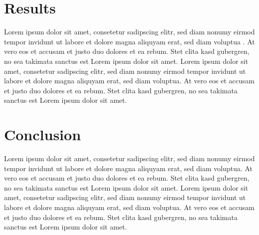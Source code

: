 \documentclass[a4paper]{article}
\begin{document}
\section{Results} %
\label{sec:results}
Lorem ipsum dolor sit amet, consetetur sadipscing elitr, sed diam nonumy eirmod tempor invidunt ut labore et dolore magna aliquyam erat, sed diam voluptua \citep[p. 48]{Baddeley:1974ts}. At vero eos et accusam et justo duo dolores et ea rebum. Stet clita kasd gubergren, no sea takimata sanctus est Lorem ipsum dolor sit amet. Lorem ipsum dolor sit amet, consetetur sadipscing elitr, sed diam nonumy eirmod tempor invidunt ut labore et dolore magna aliquyam erat, sed diam voluptua. At vero eos et accusam et justo duo dolores et ea rebum. Stet clita kasd gubergren, no sea takimata sanctus est Lorem ipsum dolor sit amet.

\section{Conclusion} %
\label{sec:conclusion}
Lorem ipsum dolor sit amet, consetetur sadipscing elitr, sed diam nonumy eirmod tempor invidunt ut labore et dolore magna aliquyam erat, sed diam voluptua. At vero eos et accusam et justo duo dolores et ea rebum. Stet clita kasd gubergren, no sea takimata sanctus est Lorem ipsum dolor sit amet. Lorem ipsum dolor sit amet, consetetur sadipscing elitr, sed diam nonumy eirmod tempor invidunt ut labore et dolore magna aliquyam erat, sed diam voluptua. At vero eos et accusam et justo duo dolores et ea rebum. Stet clita kasd gubergren, no sea takimata sanctus est Lorem ipsum dolor sit amet.


\newpage

\listoffigures
\lstlistoflistings


\end{document}
